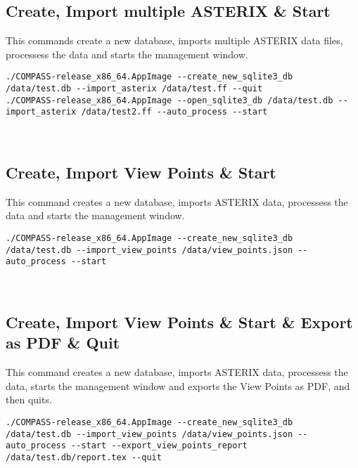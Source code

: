 \subsection{Create, Import multiple ASTERIX \& Start}

This commands create a new database, imports multiple ASTERIX data files, processess the data and starts the management window.

\begin{lstlisting}
./COMPASS-release_x86_64.AppImage --create_new_sqlite3_db /data/test.db --import_asterix /data/test.ff --quit
./COMPASS-release_x86_64.AppImage --open_sqlite3_db /data/test.db --import_asterix /data/test2.ff --auto_process --start
\end{lstlisting}
\ \\

\subsection{Create, Import View Points \& Start}

This command creates a new database, imports ASTERIX data, processess the data and starts the management window.

\begin{lstlisting}
./COMPASS-release_x86_64.AppImage --create_new_sqlite3_db /data/test.db --import_view_points /data/view_points.json --auto_process --start
\end{lstlisting}
\ \\

\subsection{Create, Import View Points \& Start \& Export as PDF \& Quit}

This command creates a new database, imports ASTERIX data, processess the data, starts the management window and exports the View Points as PDF, and then quits.

\begin{lstlisting}
./COMPASS-release_x86_64.AppImage --create_new_sqlite3_db /data/test.db --import_view_points /data/view_points.json --auto_process --start --export_view_points_report /data/test.db/report.tex --quit
\end{lstlisting}
\ \\
